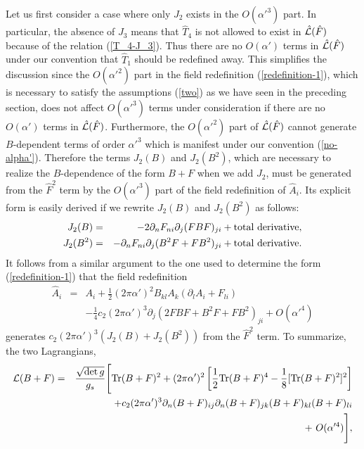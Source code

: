 \documentclass[a4paper,12pt]{article}
\begin{document}
Let us first consider a case where only $J_2$ exists
in the $O(\alpha'^3)$ part.
In particular, the absence of $J_3$ means that
$\hat{T}_4$ is not allowed to exist in $\hat{{\cal L}} (\hat{F})$
because of the relation (\ref{T_4-J_3}).
Thus there are no $O(\alpha')$ terms in $\hat{{\cal L}} (\hat{F})$
under our convention that $\hat{T}_1$ should be redefined away.
This simplifies the discussion since the $O(\alpha'^2)$ part 
in the field redefinition (\ref{redefinition-1}),
which is necessary
to satisfy the assumptions (\ref{two}) as we have seen
in the preceding section,
does not affect $O(\alpha'^3)$ terms under consideration
if there are no $O(\alpha')$ terms in $\hat{{\cal L}} (\hat{F})$.
Furthermore, the $O(\alpha'^2)$ part
of $\hat{{\cal L}} (\hat{F})$ cannot generate $B$-dependent terms
of order $\alpha'^3$
which is manifest under our convention (\ref{no-alpha'}).
Therefore the terms $J_2 (B)$ and $J_2 (B^2)$, which are necessary
to realize the $B$-dependence of the form $B+F$
when we add $J_2$, must be generated from the $\hat{F}^2$ term
by the $O(\alpha'^3)$ part of the field redefinition of $\hat{A}_i$.
Its explicit form is easily derived if we rewrite
$J_2 (B)$ and $J_2 (B^2)$ as follows:
\begin{eqnarray}
J_2 (B) &=&
-2 \partial_n F_{ni} \partial_j (F B F)_{ji}
+ {\rm total~derivative},
\\
J_2 (B^2) &=&
- \partial_n F_{ni} \partial_j (B^2 F + F B^2)_{ji}
+ {\rm total~derivative}.
\end{eqnarray}
It follows from a similar argument to the one used
to determine the form (\ref{redefinition-1}) that
the field redefinition
\begin{eqnarray}
\hat{A}_i &=& A_i + \frac{1}{2} (2 \pi \alpha')^2
B_{kl} A_k (\partial_l A_i + F_{li})
\nonumber \\
&& -\frac{1}{4} c_2 (2 \pi \alpha')^3
\partial_j ( 2 F B F + B^2 F + F B^2 )_{ji}
+ O(\alpha'^4)
\label{redefinition-2}
\end{eqnarray}
generates $c_2 (2 \pi \alpha')^3 ( J_2 (B) + J_2 (B^2) )$ from
the $\hat{F}^2$ term.
To summarize, the two Lagrangians,
\begin{eqnarray}
{\cal L}(B+F) &=& \frac{\sqrt{\det g}}{g_s} \Biggl[
{\rm Tr} (B+F)^2
+ (2 \pi \alpha')^2 \left[
\frac{1}{2} {\rm Tr} (B+F)^4
-\frac{1}{8} [ {\rm Tr} (B+F)^2 ]^2 \right]
\nonumber \\
&& \qquad \qquad + c_2 (2 \pi \alpha')^3
\partial_n (B+F)_{ij} \partial_n (B+F)_{jk} (B+F)_{kl} (B+F)_{li}
\nonumber \\
&& \qquad \qquad + ~O(\alpha'^4)
\Biggr],
\end{eqnarray}
\end{document}
